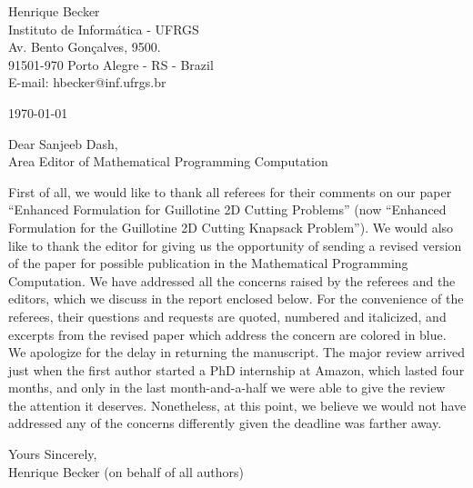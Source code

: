 \documentclass[smallextended]{svjour3}       %
\newcounter{concern}
\begin{document}
\pagestyle{empty}

\vspace{2cm}

\begin{flushright}
   \begin{minipage}{7cm}
      Henrique Becker \\
      Instituto de Informática - UFRGS \\
      Av. Bento Gonçalves, 9500. \\
      91501-970 Porto Alegre - RS - Brazil \\
      E-mail: hbecker@inf.ufrgs.br \\
   \end{minipage}
\end{flushright}

\begin{flushleft}
\today

\vspace{1.5cm}

Dear Sanjeeb Dash,\\
Area Editor of Mathematical Programming Computation
\end{flushleft}

\bigskip
First of all, we would like to thank all referees for their comments on our paper ``Enhanced Formulation for Guillotine 2D Cutting Problems'' (now ``Enhanced Formulation for the Guillotine 2D Cutting Knapsack Problem'').
We would also like to thank the editor for giving us the opportunity of sending a revised version of the paper for possible publication in the Mathematical Programming Computation.
We have addressed all the concerns raised by the referees and the editors, which we discuss in the report enclosed below.
For the convenience of the referees, their questions and requests are quoted, numbered and italicized, and excerpts from the revised paper which address the concern are colored in blue.
We apologize for the delay in returning the manuscript.
The major review arrived just when the first author started a PhD internship at Amazon, which lasted four months, and only in the last month-and-a-half we were able to give the review the attention it deserves.
Nonetheless, at this point, we believe we would not have addressed any of the concerns differently given the deadline was farther away.

\bigskip

\begin{flushleft}
Yours Sincerely,\\
Henrique Becker (on behalf of all authors)
\end{flushleft}
\end{document}
